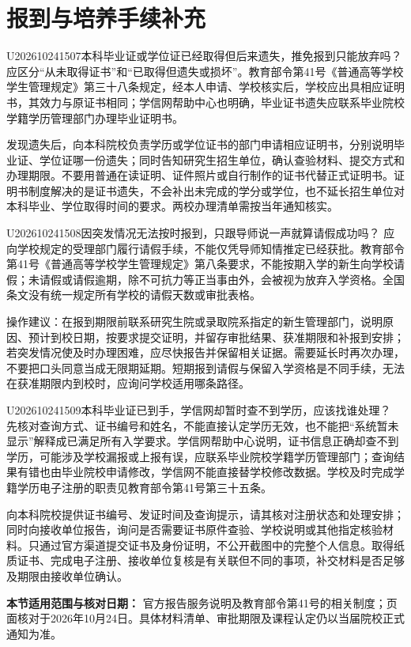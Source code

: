 \section{报到与培养手续补充}
\begin{qa}{U202610241507}{本科毕业证或学位证已经取得但后来遗失，推免报到只能放弃吗？}
应区分“从未取得证书”和“已取得但遗失或损坏”。教育部令第41号《普通高等学校学生管理规定》第三十八条规定，经本人申请、学校核实后，学校应出具相应证明书，其效力与原证书相同；学信网帮助中心也明确，毕业证书遗失应联系毕业院校学籍学历管理部门办理毕业证明书。 

发现遗失后，向本科院校负责学历或学位证书的部门申请相应证明书，分别说明毕业证、学位证哪一份遗失；同时告知研究生招生单位，确认查验材料、提交方式和办理期限。不要用普通在读证明、证件照片或自行制作的证书代替正式证明书。证明书制度解决的是证书遗失，不会补出未完成的学分或学位，也不延长招生单位对本科毕业、学位取得时间的要求。两校办理清单需按当年通知核实。
\end{qa}
\begin{qa}{U202610241508}{因突发情况无法按时报到，只跟导师说一声就算请假成功吗？}
应向学校规定的受理部门履行请假手续，不能仅凭导师知情推定已经获批。教育部令第41号《普通高等学校学生管理规定》第八条要求，不能按期入学的新生向学校请假；未请假或请假逾期，除不可抗力等正当事由外，会被视为放弃入学资格。全国条文没有统一规定所有学校的请假天数或审批表格。

操作建议：在报到期限前联系研究生院或录取院系指定的新生管理部门，说明原因、预计到校日期，按要求提交证明，并留存审批结果、获准期限和补报到安排；若突发情况使及时办理困难，应尽快报告并保留相关证据。需要延长时再次办理，不要把口头同意当成无限期延期。短期报到请假与保留入学资格是不同手续，无法在获准期限内到校时，应询问学校适用哪条路径。
\end{qa}
\begin{qa}{U202610241509}{本科毕业证已到手，学信网却暂时查不到学历，应该找谁处理？}
先核对查询方式、证书编号和姓名，不能直接认定学历无效，也不能把“系统暂未显示”解释成已满足所有入学要求。学信网帮助中心说明，证书信息正确却查不到学历，可能涉及学校漏报或上报有误，应联系毕业院校学籍学历管理部门；查询结果有错也由毕业院校申请修改，学信网不能直接替学校修改数据。学校及时完成学籍学历电子注册的职责见教育部令第41号第三十五条。 

向本科院校提供证书编号、发证时间及查询提示，请其核对注册状态和处理安排；同时向接收单位报告，询问是否需要证书原件查验、学校说明或其他指定核验材料。只通过官方渠道提交证书及身份证明，不公开截图中的完整个人信息。取得纸质证书、完成电子注册、接收单位复核是有关联但不同的事项，补交材料是否足够及期限由接收单位确认。
\end{qa}
\par\textbf{本节适用范围与核对日期：} 官方报告服务说明及教育部令第41号的相关制度；页面核对于2026年10月24日。具体材料清单、审批期限及课程认定仍以当届院校正式通知为准。

